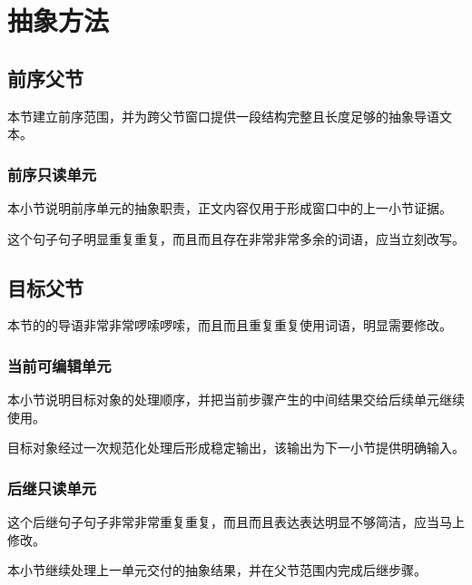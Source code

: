 \section{抽象方法}

\subsection{前序父节}
本节建立前序范围，并为跨父节窗口提供一段结构完整且长度足够的抽象导语文本。

\subsubsection{前序只读单元}
本小节说明前序单元的抽象职责，正文内容仅用于形成窗口中的上一小节证据。

这个句子句子明显重复重复，而且而且存在非常非常多余的词语，应当立刻改写。

\subsection{目标父节}
本节的的导语非常非常啰嗦啰嗦，而且而且重复重复使用词语，明显需要修改。

\subsubsection{当前可编辑单元}
本小节说明目标对象的处理顺序，并把当前步骤产生的中间结果交给后续单元继续使用。

目标对象经过一次规范化处理后形成稳定输出，该输出为下一小节提供明确输入。

\subsubsection{后继只读单元}
这个后继句子句子非常非常重复重复，而且而且表达表达明显不够简洁，应当马上修改。

本小节继续处理上一单元交付的抽象结果，并在父节范围内完成后继步骤。
